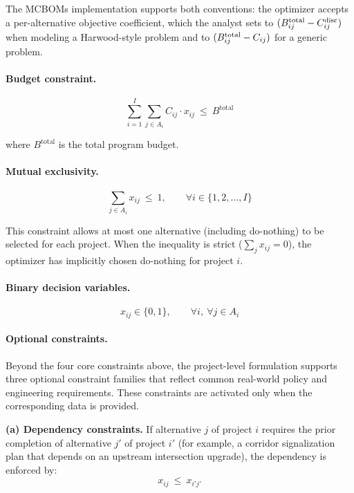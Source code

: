 The MCBOMs implementation supports both conventions: the optimizer
accepts a per-alternative objective coefficient, which the analyst sets
to $(B^{\mathrm{total}}_{ij} - C_{ij}^{\mathrm{disc}})$ when modeling a Harwood-style
problem and to $(B^{\mathrm{total}}_{ij} - C_{ij})$ for a generic problem.

\paragraph{Budget constraint.}
\begin{equation}
\sum_{i=1}^{I} \sum_{j \in A_i} C_{ij} \cdot x_{ij}\ \leq\ B^{\mathrm{total}}
\label{eq:budget-project}
\end{equation}

\noindent where $B^{\mathrm{total}}$ is the total program budget.

\paragraph{Mutual exclusivity.}
\begin{equation}
\sum_{j \in A_i} x_{ij}\ \leq\ 1, \qquad \forall i \in \{1, 2, \ldots, I\}
\label{eq:mutex}
\end{equation}

This constraint allows at most one alternative (including do-nothing) to be
selected for each project. When the inequality is strict ($\sum_j x_{ij} = 0$),
the optimizer has implicitly chosen do-nothing for project $i$.

\paragraph{Binary decision variables.}
\begin{equation}
x_{ij} \in \{0, 1\}, \qquad \forall i,\ \forall j \in A_i
\label{eq:binary-project}
\end{equation}

\paragraph{Optional constraints.} Beyond the four core constraints above,
the project-level formulation supports three optional constraint families
that reflect common real-world policy and engineering requirements. These
constraints are activated only when the corresponding data is provided.

\textbf{(a) Dependency constraints.} If alternative $j$ of project $i$
requires the prior completion of alternative $j'$ of project $i'$ (for
example, a corridor signalization plan that depends on an upstream
intersection upgrade), the dependency is enforced by:
\begin{equation}
x_{ij}\ \leq\ x_{i'j'}
\label{eq:dependency}
\end{equation}

